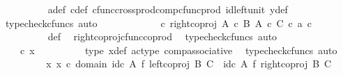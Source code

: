 \begin{isabellebody}
\ \ \ \ \ \ \ \ \isamarkupfalse%
\ a{\isacharunderscore}{\kern0pt}def\ c{\isacharunderscore}{\kern0pt}def\ cfunc{\isacharunderscore}{\kern0pt}cross{\isacharunderscore}{\kern0pt}prod{\isacharunderscore}{\kern0pt}comp{\isacharunderscore}{\kern0pt}cfunc{\isacharunderscore}{\kern0pt}prod\ id{\isacharunderscore}{\kern0pt}left{\isacharunderscore}{\kern0pt}unit{}\ y{\isacharunderscore}{\kern0pt}def{}\ \isamarkupfalse%
\ {\isacharparenleft}{\kern0pt}typecheck{\isacharunderscore}{\kern0pt}cfuncs{\isacharcomma}{\kern0pt}\ auto{\isacharparenright}{\kern0pt}\isanewline
\ \ \ \ \ \ \isamarkupfalse%
\ \isamarkupfalse%
\ {\isachardoublequoteopen}{\isachardot}{\kern0pt}{\isachardot}{\kern0pt}{\isachardot}{\kern0pt}\ {\isacharequal}{\kern0pt}\ {\isacharparenleft}{\kern0pt}{\isasymphi}\ {\isasymcirc}\isactrlsub c\ right{\isacharunderscore}{\kern0pt}coproj\ {\isacharparenleft}{\kern0pt}A\ {\isasymtimes}\isactrlsub c\ B{\isacharparenright}{\kern0pt}\ {\isacharparenleft}{\kern0pt}A\ {\isasymtimes}\isactrlsub c\ C{\isacharparenright}{\kern0pt}{\isacharparenright}{\kern0pt}\ {\isasymcirc}\isactrlsub c\ {\isasymlangle}a{\isacharcomma}{\kern0pt}\ c{\isasymrangle}{\isachardoublequoteclose}\isanewline
\ \ \ \ \ \ \ \ \isamarkupfalse%
\ {\isasymphi}{\isacharunderscore}{\kern0pt}def\ \isamarkupfalse%
\ right{\isacharunderscore}{\kern0pt}coproj{\isacharunderscore}{\kern0pt}cfunc{\isacharunderscore}{\kern0pt}coprod\ \isamarkupfalse%
\ {\isacharparenleft}{\kern0pt}typecheck{\isacharunderscore}{\kern0pt}cfuncs{\isacharcomma}{\kern0pt}\ auto{\isacharparenright}{\kern0pt}\isanewline
\ \ \ \ \ \ \isamarkupfalse%
\ \isamarkupfalse%
\ {\isachardoublequoteopen}{\isachardot}{\kern0pt}{\isachardot}{\kern0pt}{\isachardot}{\kern0pt}\ {\isacharequal}{\kern0pt}\ {\isasymphi}\ {\isasymcirc}\isactrlsub c\ x{\isachardoublequoteclose}\isanewline
\ \ \ \ \ \ \ \ \isamarkupfalse%
\ {\isasymphi}{\isacharunderscore}{\kern0pt}type\ x{\isacharunderscore}{\kern0pt}def\ ac{\isacharunderscore}{\kern0pt}type\ comp{\isacharunderscore}{\kern0pt}associative{}\ \isamarkupfalse%
\ {\isacharparenleft}{\kern0pt}typecheck{\isacharunderscore}{\kern0pt}cfuncs{\isacharcomma}{\kern0pt}\ auto{\isacharparenright}{\kern0pt}\isanewline
\ \ \ \ \ \ \isamarkupfalse%
\ \isamarkupfalse%
\ {\isachardoublequoteopen}{\isasymexists}x{\isachardot}{\kern0pt}\ x\ {\isasymin}\isactrlsub c\ domain\ {\isacharparenleft}{\kern0pt}{\isacharparenleft}{\kern0pt}id\isactrlsub c\ A\ {\isasymtimes}\isactrlsub f\ left{\isacharunderscore}{\kern0pt}coproj\ B\ C{\isacharparenright}{\kern0pt}\ {\isasymamalg}\ {\isacharparenleft}{\kern0pt}id\isactrlsub c\ A\ {\isasymtimes}\isactrlsub f\ right{\isacharunderscore}{\kern0pt}coproj\ B\ C{\isacharparenright}{\kern0pt}{\isacharparenright}{\kern0pt}\ {\isasymand}\isanewline

\end{isabellebody}
